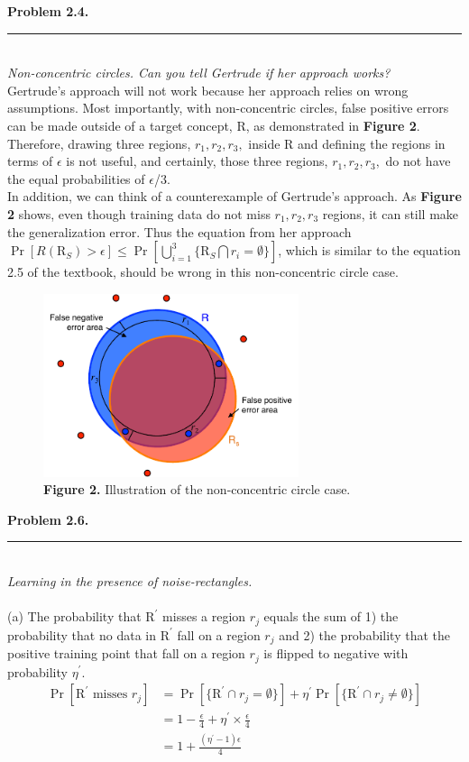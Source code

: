 \documentclass[letterpaper,11pt,notitlepage]{article}
\begin{document}
\hspace*{-1cm}\textbf{Problem 2.4.}  \rule{10.5cm}{0.4pt}\\
\noindent\textit{Non-concentric circles. Can you tell Gertrude if her approach works?}\\

\indent Gertrude's approach will not work because her approach relies on wrong assumptions. Most importantly, with non-concentric circles, false positive errors can be made outside of a target concept, R, as demonstrated in \textbf{Figure 2}. Therefore, drawing three regions, $r_1, r_2, r_3,$ inside R and defining the regions in terms of $\epsilon$ is not useful, and certainly, those three regions, $r_1, r_2, r_3,$ do not have the equal probabilities of $\epsilon$/3.\\
\indent In addition, we can think of a counterexample of Gertrude's approach. As \textbf{Figure 2} shows, even though training data do not miss $r_1, r_2, r_3$ regions, it can still make the generalization error. Thus the equation from her approach 
$\Pr[R(\text{R}_S)>\epsilon]\le \Pr[\bigcup^{3}_{i=1}\{\text{R}_S \bigcap r_i=\emptyset\}]$, which is similar to the equation 2.5 of the textbook, should be wrong in this non-concentric circle case. 

\begin{figure}[ht!]
	\centering
	\includegraphics[width=7.5cm]{Figure2}
	\captionsetup{width=.8\textwidth}
	\caption{\textbf{Figure 2.} Illustration of the non-concentric circle case.} 
\end{figure}

\hspace*{-1cm}\textbf{Problem 2.6.}  \rule{10.5cm}{0.4pt}\\
\noindent\textit{Learning in the presence of noise-rectangles.}\\\\

\noindent (a) The probability that $\text{R}^\prime$ misses a region $r_j$ equals the sum of 1) the probability that 
no data in $\text{R}^\prime$ fall on a region $r_j$ and 2) the probability that the positive training point that fall on a region $r_j$ is flipped to negative with probability $\eta^\prime$. 
\begin{align*}
\Pr[\text{R}^\prime \text{ misses }r_j] &= \Pr[\{\text{R}^\prime \cap r_j =\emptyset\}] + \eta^\prime\Pr[\{\text{R}^\prime \cap r_j \neq\emptyset\}]\\
&= 1-\frac{\epsilon}{4} + \eta^\prime\times\frac{\epsilon}{4}\\
&= 1+\frac{(\eta^\prime-1)\epsilon}{4}\\
\end{align*}
\end{document}
